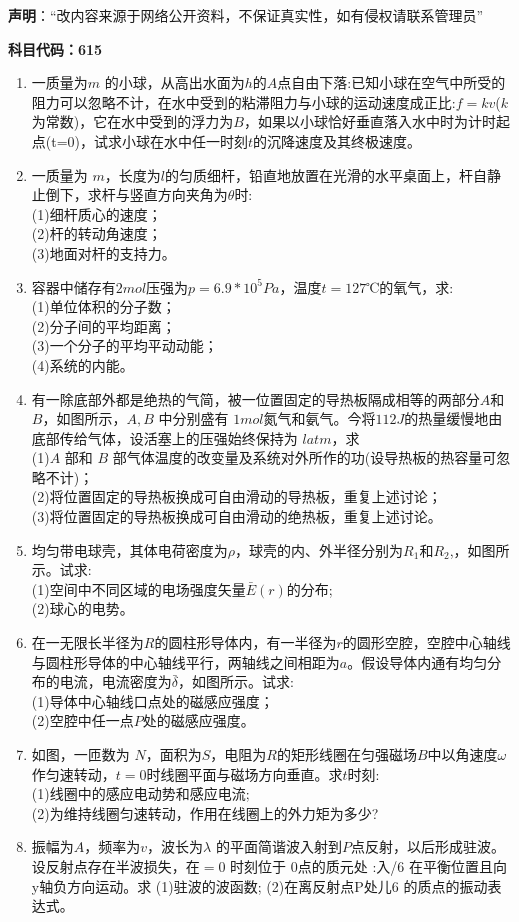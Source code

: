 

\textbf{声明}：“改内容来源于网络公开资料，不保证真实性，如有侵权请联系管理员”


\textbf{科目代码：615}

\begin{enumerate}
\item 一质量为$ m$ 的小球，从高出水面为$h$的$ A $点自由下落:已知小球在空气中所受的阻力可以忽略不计，在水中受到的粘滞阻力与小球的运动速度成正比:$f=kv$($k$为常数)，它在水中受到的浮力为$ B$，如果以小球恰好垂直落入水中时为计时起点(t=0)，试求小球在水中任一时刻$t$的沉降速度及其终极速度。
\item 一质量为 $m$，长度为$l$的匀质细杆，铅直地放置在光滑的水平桌面上，杆自静止倒下，求杆与竖直方向夹角为$\theta$时:\\
(1)细杆质心的速度；\\
(2)杆的转动角速度；\\
(3)地面对杆的支持力。
\item 容器中储存有$2mol $压强为$ p=6.9*10^5Pa$，温度$t=127$℃的氧气，求:\\
(1)单位体积的分子数；\\
(2)分子间的平均距离；\\
(3)一个分子的平均平动动能；\\
(4)系统的内能。
\item 有一除底部外都是绝热的气简，被一位置固定的导热板隔成相等的两部分$A$和 $B$，如图所示，$A,B$ 中分别盛有 $1mol$氮气和氨气。今将$112J$的热量缓慢地由底部传给气体，设活塞上的压强始终保持为 $latm$，求\\
(1)$A$ 部和 $B$ 部气体温度的改变量及系统对外所作的功(设导热板的热容量可忽略不计)；\\
(2)将位置固定的导热板换成可自由滑动的导热板，重复上述讨论；\\
(3)将位置固定的导热板换成可自由滑动的绝热板，重复上述讨论。
\item 均匀带电球壳，其体电荷密度为$\rho$，球壳的内、外半径分别为$R_1$和$R_2$,，如图所示。试求:\\
(1)空间中不同区域的电场强度矢量$\bar E(r)$的分布;\\
(2)球心的电势。
\item 在一无限长半径为$R$的圆柱形导体内，有一半径为$r$的圆形空腔，空腔中心轴线与圆柱形导体的中心轴线平行，两轴线之间相距为$a$。假设导体内通有均匀分布的电流，电流密度为$\bar \delta$，如图所示。试求:\\
(1)导体中心轴线口点处的磁感应强度；\\
(2)空腔中任一点$P$处的磁感应强度。
\item 如图，一匝数为 $N$，面积为$ S$，电阻为$ R$的矩形线圈在匀强磁场$ B$中以角速度$\omega$作匀速转动，$t=0$时线圈平面与磁场方向垂直。求$t$时刻:\\
(1)线圈中的感应电动势和感应电流;\\
(2)为维持线圈匀速转动，作用在线圈上的外力矩为多少?
\item 振幅为$A$，频率为$v$，波长为$\lambda$ 的平面简谐波入射到$P$点反射，以后形成驻波。设反射点存在半波损失，在$=0$ 时刻位于 0点的质元处
:入/6
在平衡位置且向y轴负方向运动。求
(1)驻波的波函数;
(2)在离反射点P处儿6 的质点的振动表达式。
\end{enumerate}
